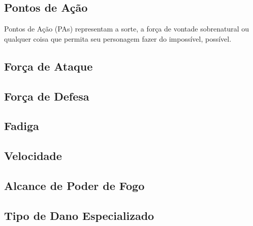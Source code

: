 \subsection{Pontos de Ação}

Pontos de Ação (PAs) representam a sorte, a força de vontade sobrenatural ou qualquer coisa que permita seu personagem fazer do impossível, possível.

\subsection{Força de Ataque}

\subsection{Força de Defesa}

\subsection{Fadiga}

\subsection{Velocidade}

\subsection{Alcance de Poder de Fogo}

\subsection{Tipo de Dano Especializado}
